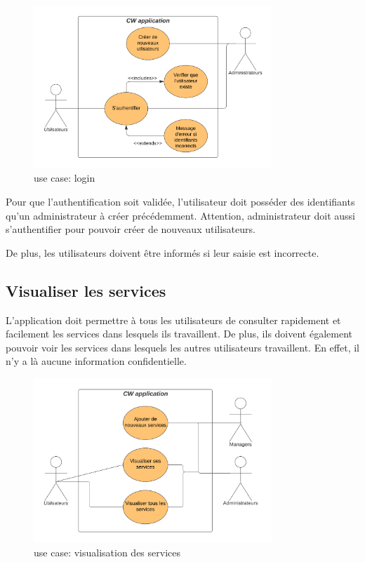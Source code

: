 \begin{figure}[!h]
    \begin{center}
        \includegraphics[width= 0.8\textwidth]{uses cases/logginUC.png}
    \end{center}
    \caption{use case: login}
\end{figure}

Pour que l'authentification soit validée, l'utilisateur doit posséder des identifiants qu'un administrateur à créer précédemment. Attention, administrateur doit aussi s'authentifier pour pouvoir créer de nouveaux utilisateurs.

De plus, les utilisateurs doivent être informés si leur saisie est incorrecte.

\subsection*{Visualiser les services}
L'application doit permettre à tous les utilisateurs de consulter rapidement et facilement les services dans lesquels ils travaillent. De plus, ils doivent également pouvoir voir les services dans lesquels les autres utilisateurs travaillent. En effet, il n'y a là aucune information confidentielle.

\begin{figure}[!h]
    \begin{center}
        \includegraphics[width= 0.8\textwidth]{uses cases/visualiser services.png}
    \end{center}
    \caption{use case: visualisation des services}
\end{figure}

